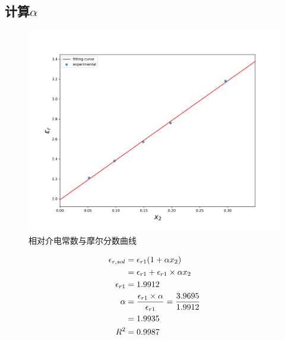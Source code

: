 \documentclass[a4paper]{article}
\begin{document}
\subsection{计算$\alpha$}
\begin{figure}[H]
	\centering
	\includegraphics[width = 0.5\paperwidth]{fig/jiedian.png}
	\caption{相对介电常数与摩尔分数曲线}
\end{figure}
\begin{equation}
	\centering
	\begin{aligned}
		\epsilon_{r, sol} &= \epsilon_{r1}(1+\alpha x_{2})\\
											&= \epsilon_{r1}+\epsilon_{r1}\times \alpha x_{2}\\
		\epsilon_{r1} &= 1.9912\\
		\alpha &= \frac{\epsilon_{r1}\times \alpha}{\epsilon_{r1}} = \frac{3.9695}{1.9912}\\
						&= 1.9935\\
		R^{2} &= 0.9987\\
	\end{aligned}
\end{equation}
\end{document}
